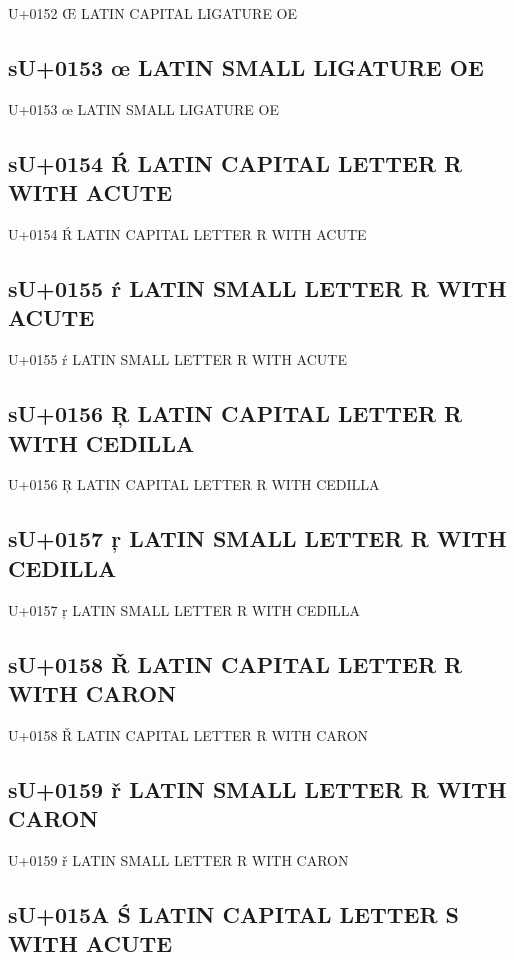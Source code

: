 U+0152 Œ  LATIN CAPITAL LIGATURE OE

\subsection{sU+0153 œ  LATIN SMALL LIGATURE OE}

U+0153 œ  LATIN SMALL LIGATURE OE

\subsection{sU+0154 Ŕ  LATIN CAPITAL LETTER R WITH ACUTE}

U+0154 Ŕ  LATIN CAPITAL LETTER R WITH ACUTE

\subsection{sU+0155 ŕ  LATIN SMALL LETTER R WITH ACUTE}

U+0155 ŕ  LATIN SMALL LETTER R WITH ACUTE

\subsection{sU+0156 Ŗ  LATIN CAPITAL LETTER R WITH CEDILLA}

U+0156 Ŗ  LATIN CAPITAL LETTER R WITH CEDILLA

\subsection{sU+0157 ŗ  LATIN SMALL LETTER R WITH CEDILLA}

U+0157 ŗ  LATIN SMALL LETTER R WITH CEDILLA

\subsection{sU+0158 Ř  LATIN CAPITAL LETTER R WITH CARON}

U+0158 Ř  LATIN CAPITAL LETTER R WITH CARON

\subsection{sU+0159 ř  LATIN SMALL LETTER R WITH CARON}

U+0159 ř  LATIN SMALL LETTER R WITH CARON

\subsection{sU+015A Ś  LATIN CAPITAL LETTER S WITH ACUTE}

